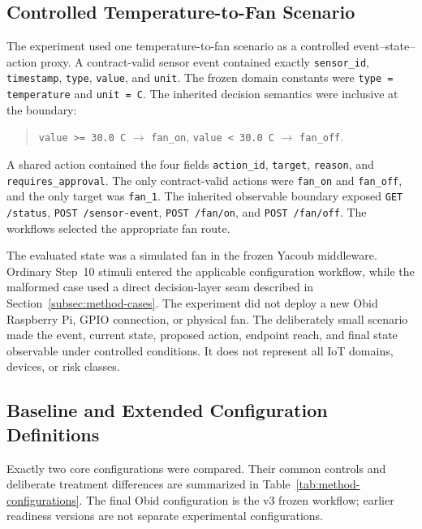 \subsection{Controlled Temperature-to-Fan Scenario}\label{subsec:method-scenario}

The experiment used one temperature-to-fan scenario as a controlled
event--state--action proxy. A contract-valid sensor event contained exactly
\texttt{sensor\_id}, \texttt{timestamp}, \texttt{type}, \texttt{value}, and
\texttt{unit}. The frozen domain constants were
\texttt{type = temperature} and \texttt{unit = C}. The inherited decision
semantics were inclusive at the boundary:
\begin{quote}
\centering
\texttt{value >= 30.0 C} $\rightarrow$ \texttt{fan\_on},\qquad
\texttt{value < 30.0 C} $\rightarrow$ \texttt{fan\_off}.
\end{quote}

A shared action contained the four fields \texttt{action\_id},
\texttt{target}, \texttt{reason}, and \texttt{requires\_approval}. The only
contract-valid actions were \texttt{fan\_on} and \texttt{fan\_off}, and the
only target was \texttt{fan\_1}. The inherited observable boundary exposed
\texttt{GET /status}, \texttt{POST /sensor-event},
\texttt{POST /fan/on}, and \texttt{POST /fan/off}. The workflows selected the
appropriate fan route.

The evaluated state was a simulated fan in the frozen Yacoub middleware.
Ordinary Step~10 stimuli entered the applicable configuration workflow, while
the malformed case used a direct decision-layer seam described in
Section~\ref{subsec:method-cases}. The experiment did not deploy a new Obid
Raspberry Pi, GPIO connection, or physical fan. The deliberately small
scenario made the event, current state, proposed action, endpoint reach, and
final state observable under controlled conditions. It does not represent all
IoT domains, devices, or risk classes.

\subsection{Baseline and Extended Configuration Definitions}\label{subsec:method-configurations}

Exactly two core configurations were compared. Their common controls and
deliberate treatment differences are summarized in
Table~\ref{tab:method-configurations}. The final Obid configuration is the v3
frozen workflow; earlier readiness versions are not separate experimental
configurations.


